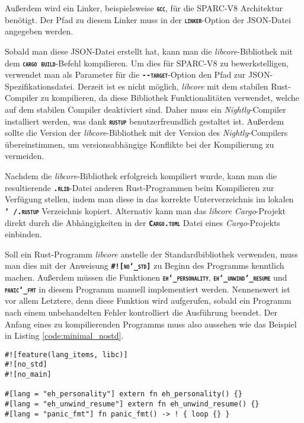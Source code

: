 Außerdem wird ein Linker, beispielsweise \texttt{\textsc{\textbf{gcc}}},
für die SPARC-V8 Architektur benötigt. Der Pfad zu diesem Linker
muss in der \texttt{\textsc{\textbf{linker}}}-Option der JSON-Datei angegeben werden.

Sobald man diese JSON-Datei erstellt hat, kann man die \textit{libcore}-Bibliothek mit dem
\texttt{\textsc{\textbf{cargo build}}}-Befehl kompilieren.
Um dies für SPARC-V8 zu bewerkstelligen, verwendet man als Parameter für die
\texttt{\textsc{\textbf{-{}-target}}}-Option den Pfad zur JSON-Spezifikationsdatei.
Derzeit ist es nicht möglich, \textit{libcore} mit dem stabilen Rust-Compiler zu kompilieren,
da diese Bibliothek Funktionalitäten verwendet, welche auf dem stabilen Compiler deaktiviert sind.
Daher muss ein \textit{Nightly}-Compiler installiert werden, was
dank \texttt{\textsc{\textbf{rustup}}} benutzerfreundlich gestaltet ist.
Außerdem sollte die Version der \textit{libcore}-Bibliothek
mit der Version des \textit{Nightly}-Compilers übereinstimmen,
um versionsabhängige Konflikte bei der Kompilierung zu vermeiden.

Nachdem die \textit{libcore}-Bibliothek erfolgreich kompiliert wurde, kann man
die resultierende \texttt{\textsc{\textbf{.rlib}}}-Datei anderen Rust-Programmen
beim Kompilieren zur Verfügung stellen, indem man diese in das korrekte Unterverzeichnis im
lokalen \texttt{\textsc{\textbf{\char`~/.rustup}}} Verzeichnis kopiert.
Alternativ kann man das \textit{libcore} \textit{Cargo}-Projekt direkt durch die Abhängigkeiten in der
\texttt{\textsc{\textbf{Cargo.toml}}} Datei eines \textit{Cargo}-Projekts einbinden.

Soll ein Rust-Programm \textit{libcore} anstelle der Standardbibliothek verwenden, muss man dies
mit der Anweisung \texttt{\textsc{\textbf{\#![no\char`_std]}}}
zu Beginn des Programms kenntlich machen.
Außerdem müssen die Funktionen \texttt{\textsc{\textbf{eh\char`_personality}}},
\texttt{\textsc{\textbf{eh\char`_unwind\char`_resume}}} und
\texttt{\textsc{\textbf{panic\char`_fmt}}} in diesem Programm manuell implementiert werden.
Nennenswert ist vor allem Letztere, denn diese Funktion
wird aufgerufen, sobald ein Programm nach einem unbehandelten Fehler kontrolliert die Ausführung beendet.
Der Anfang eines zu kompilierenden Programms muss also aussehen wie das Beispiel in Listing \ref{code:minimal_nostd}.

\begin{lstlisting}[float,caption={
Der Beginn eines Rust-Programms, welches nicht die Standardbibliothek verwendet.
},label=code:minimal_nostd]
#![feature(lang_items, libc)]
#![no_std]
#![no_main]

#[lang = "eh_personality"] extern fn eh_personality() {}
#[lang = "eh_unwind_resume"] extern fn eh_unwind_resume() {}
#[lang = "panic_fmt"] fn panic_fmt() -> ! { loop {} }
\end{lstlisting}

